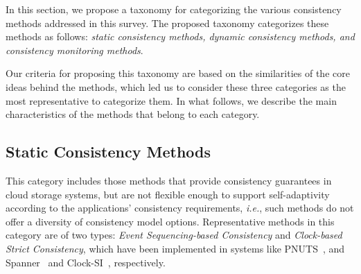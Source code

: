 In this section, we propose a taxonomy for categorizing the various consistency methods addressed in this survey. The proposed taxonomy categorizes these methods as follows: \emph{static consistency methods, dynamic consistency methods, and consistency monitoring methods}. 

Our criteria for proposing this taxonomy are based on the similarities of the core ideas behind the methods, %
which led us to consider these three categories as the most representative to categorize them. In what follows, we describe the main characteristics of the methods that belong to each category. 
\vspace{3mm}

\subsection{Static Consistency Methods}

This category includes those methods that provide consistency guarantees in cloud storage systems, but are not flexible enough to support self-adaptivity according to the applications' consisten\-cy requirements, \textit{i.e.}, such methods do not offer a diversity of consistency model options. Representative methods in this category are of two types: \textit{Event Sequencing-based Consistency} and \textit{Clock-bas\-ed Strict Consistency}, which have been  imple\-mented  in systems like PNUTS~\cite{cooper2008pnuts}, and  Spanner~\cite{Corbett:2013} and Clock-SI~\cite{Du2013}, respectively.
\vspace{3mm}

\begin{comment}

This category includes those consistency methods that rely on mechanisms that support service-oriented replication or partitioned data storage.
The predominant characteristic of these methods is that 
they are not flexibile enough to support the clients' consistency requirements and, therefore, do not provide a diversity of consistency options. %
Representative methods in this category 
{\al are of two types: \textit{Event Sequencing-based Consistency} and \textit{Clock-bas\-ed Strict Consistency}, which have been  imple\-mented  in systems like PNUTS~\cite{cooper2008pnuts}, and  Spanner~\cite{Corbett:2013} and Clock-SI~\cite{Du2013},  respectively}.

\end{comment}

